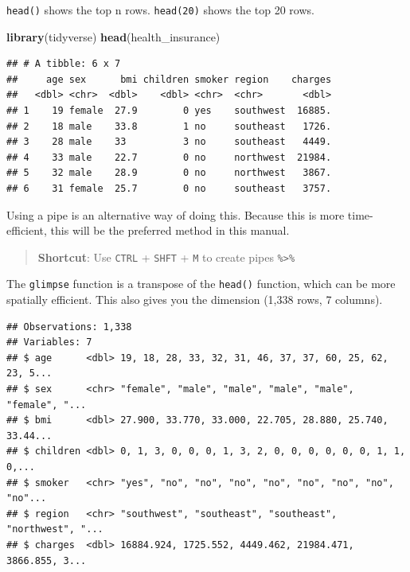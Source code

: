 \documentclass[]{book}
\newenvironment{Shaded}{\begin{snugshade}}{\end{snugshade}}
\newcommand{\KeywordTok}[1]{\textcolor[rgb]{0.13,0.29,0.53}{\textbf{#1}}}
\newcommand{\NormalTok}[1]{#1}
\newcommand{\OperatorTok}[1]{\textcolor[rgb]{0.81,0.36,0.00}{\textbf{#1}}}
\newcommand{\StringTok}[1]{\textcolor[rgb]{0.31,0.60,0.02}{#1}}
\begin{document}
\texttt{head()} shows the top n rows. \texttt{head(20)} shows the top 20 rows.

\begin{Shaded}
\begin{Highlighting}[]
\KeywordTok{library}\NormalTok{(tidyverse)}
\KeywordTok{head}\NormalTok{(health_insurance)}
\end{Highlighting}
\end{Shaded}

\begin{verbatim}
## # A tibble: 6 x 7
##     age sex      bmi children smoker region    charges
##   <dbl> <chr>  <dbl>    <dbl> <chr>  <chr>       <dbl>
## 1    19 female  27.9        0 yes    southwest  16885.
## 2    18 male    33.8        1 no     southeast   1726.
## 3    28 male    33          3 no     southeast   4449.
## 4    33 male    22.7        0 no     northwest  21984.
## 5    32 male    28.9        0 no     northwest   3867.
## 6    31 female  25.7        0 no     southeast   3757.
\end{verbatim}

Using a pipe is an alternative way of doing this. Because this is more time-efficient, this will be the preferred method in this manual.

\begin{Shaded}
\end{Shaded}

\begin{quote}
\textbf{Shortcut}: Use \texttt{CTRL} + \texttt{SHFT} + \texttt{M} to create pipes \texttt{\%\textgreater{}\%}
\end{quote}

The \texttt{glimpse} function is a transpose of the \texttt{head()} function, which can be more spatially efficient. This also gives you the dimension (1,338 rows, 7 columns).

\begin{Shaded}
\end{Shaded}

\begin{verbatim}
## Observations: 1,338
## Variables: 7
## $ age      <dbl> 19, 18, 28, 33, 32, 31, 46, 37, 37, 60, 25, 62, 23, 5...
## $ sex      <chr> "female", "male", "male", "male", "male", "female", "...
## $ bmi      <dbl> 27.900, 33.770, 33.000, 22.705, 28.880, 25.740, 33.44...
## $ children <dbl> 0, 1, 3, 0, 0, 0, 1, 3, 2, 0, 0, 0, 0, 0, 0, 1, 1, 0,...
## $ smoker   <chr> "yes", "no", "no", "no", "no", "no", "no", "no", "no"...
## $ region   <chr> "southwest", "southeast", "southeast", "northwest", "...
## $ charges  <dbl> 16884.924, 1725.552, 4449.462, 21984.471, 3866.855, 3...
\end{verbatim}
\end{document}
